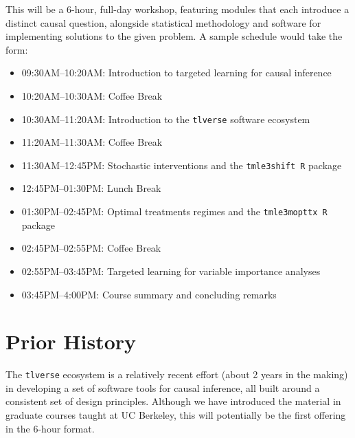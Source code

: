 \documentclass[a4paper,11pt]{texMemo}
\begin{document}
This will be a 6-hour, full-day workshop, featuring modules that each introduce
a distinct causal question, alongside statistical methodology and software for
implementing solutions to the given problem. A sample schedule would take the
form:
\begin{itemize}
  \itemsep0pt
  \item 09:30AM--10:20AM: Introduction to targeted learning for causal inference
  \item 10:20AM--10:30AM: Coffee Break
  \item 10:30AM--11:20AM: Introduction to the \texttt{tlverse} software
    ecosystem
  \item 11:20AM--11:30AM: Coffee Break
  \item 11:30AM--12:45PM: Stochastic interventions and the \texttt{tmle3shift R}
    package
  \item 12:45PM--01:30PM: Lunch Break
  \item 01:30PM--02:45PM: Optimal treatments regimes and the
    \texttt{tmle3mopttx R} package
  \item 02:45PM--02:55PM: Coffee Break
  \item 02:55PM--03:45PM: Targeted learning for variable importance analyses
  \item 03:45PM--4:00PM: Course summary and concluding remarks
\end{itemize}

\section{Prior History}

The \texttt{tlverse} ecosystem is a relatively recent effort (about 2 years in
the making) in developing a set of software tools for causal inference, all
built around a consistent set of design principles. Although we have introduced
the material in graduate courses taught at UC Berkeley, this will potentially be
the first offering in the 6-hour format.
\end{document}
